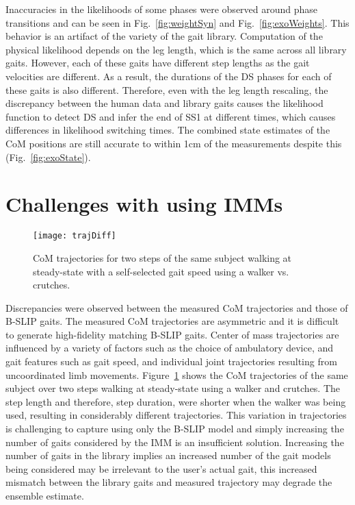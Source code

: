 Inaccuracies in the likelihoods of some phases were observed around phase transitions and can be seen in Fig.~\ref{fig:weightSyn} and Fig.~\ref{fig:exoWeights}. This behavior is an artifact of the variety of the gait library. Computation of the physical likelihood depends on the leg length, which is the same across all library gaits. However, each of these gaits have different step lengths as the gait velocities are different. As a result, the durations of the DS phases for each of these gaits is also different. Therefore, even with the leg length rescaling, the discrepancy between the human data and library gaits causes the likelihood function to detect DS and infer the end of SS1 at different times, which causes differences in likelihood switching times. The combined state estimates of the CoM positions are still accurate to within 1cm of the measurements despite this (Fig.~\ref{fig:exoState}).

\section{Challenges with using IMMs} \label{sec:challenges}

\begin{figure}
	\centering
	\texttt{[image: trajDiff]}
	\caption{CoM trajectories for two steps of the same subject walking at steady-state with a self-selected gait speed using a walker vs. crutches.}\label{fig:trajDiff}
\end{figure}
Discrepancies were observed between the measured CoM trajectories and those of B-SLIP gaits. The measured CoM trajectories are asymmetric and it is difficult to generate high-fidelity matching B-SLIP gaits. Center of mass trajectories are influenced by a variety of factors such as the choice of ambulatory device, and gait features such as gait speed, and individual joint trajectories resulting from uncoordinated limb movements. Figure~\ref{fig:trajDiff} shows the CoM trajectories of the same subject over two steps walking at steady-state using a walker and crutches. The step length and therefore, step duration, were shorter when the walker was being used, resulting in considerably different trajectories. This variation in trajectories is challenging to capture using only the B-SLIP model and simply increasing the number of gaits considered by the IMM is an insufficient solution. Increasing the number of gaits in the library implies an increased number of the gait models being considered may be irrelevant to the user's actual gait, this increased mismatch between the library gaits and measured trajectory may degrade the ensemble estimate.

